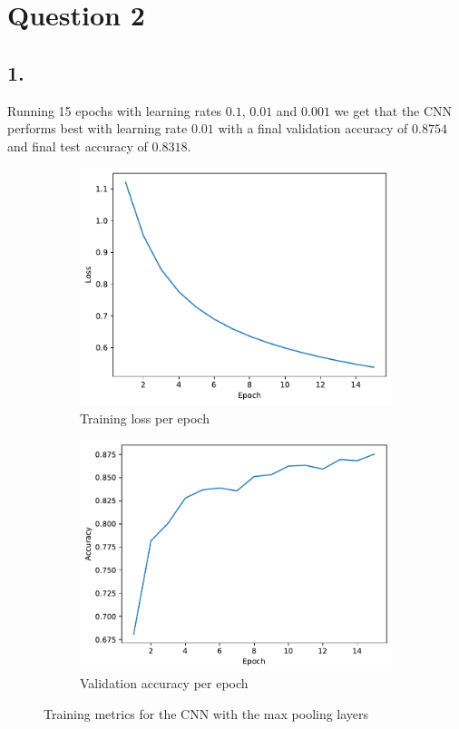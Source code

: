 \documentclass[11pt]{article}
\begin{document}
\section{Question 2}
\subsection{1.}
Running 15 epochs with learning rates $0.1$, $0.01$ and $0.001$ we get that the CNN performs best with learning rate $0.01$ with a final validation accuracy of $0.8754$ and final test accuracy of $0.8318$. 

\begin{figure}[H]
  \centering
  \begin{subfigure}{.5\textwidth}
    \centering \includegraphics[width=.9\linewidth]{plots/CNN-training-loss-0.01-0.7-0-sgd-False}
  \caption{Training loss per epoch}
\end{subfigure}%
\begin{subfigure}{.5\textwidth}
  \centering
  \includegraphics[width=.9\linewidth]{plots/CNN-validation-accuracy-0.01-0.7-0-sgd-False}
  \caption{Validation accuracy per epoch}
\end{subfigure}
\caption{Training metrics for the CNN with the max pooling layers}
\label{fig:cnn_with_max_pool}
\end{figure}
\end{document}
